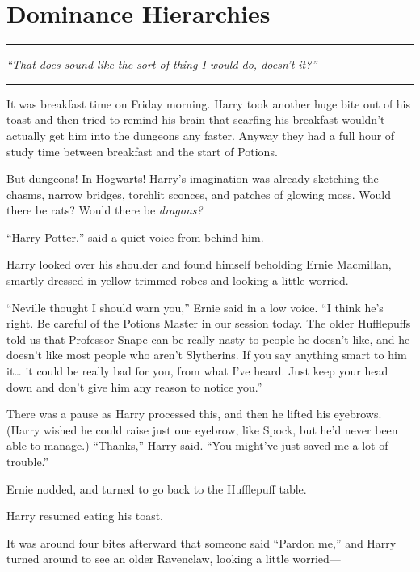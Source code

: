 \chapter{Dominance Hierarchies}

\begin{center}\rule{3in}{0.4pt}\end{center}

\emph{``That does sound like the sort of thing I would do, doesn't
it?''}

\begin{center}\rule{3in}{0.4pt}\end{center}

It was breakfast time on Friday morning. Harry took another huge bite
out of his toast and then tried to remind his brain that scarfing his
breakfast wouldn't actually get him into the dungeons any faster. Anyway
they had a full hour of study time between breakfast and the start of
Potions.

But dungeons! In Hogwarts! Harry's imagination was already sketching the
chasms, narrow bridges, torchlit sconces, and patches of glowing moss.
Would there be rats? Would there be \emph{dragons?}

``Harry Potter,'' said a quiet voice from behind him.

Harry looked over his shoulder and found himself beholding Ernie
Macmillan, smartly dressed in yellow-trimmed robes and looking a little
worried.

``Neville thought I should warn you,'' Ernie said in a low voice. ``I
think he's right. Be careful of the Potions Master in our session today.
The older Hufflepuffs told us that Professor Snape can be really nasty
to people he doesn't like, and he doesn't like most people who aren't
Slytherins. If you say anything smart to him it\ldots{} it could be
really bad for you, from what I've heard. Just keep your head down and
don't give him any reason to notice you.''

There was a pause as Harry processed this, and then he lifted his
eyebrows. (Harry wished he could raise just one eyebrow, like Spock, but
he'd never been able to manage.) ``Thanks,'' Harry said. ``You might've
just saved me a lot of trouble.''

Ernie nodded, and turned to go back to the Hufflepuff table.

Harry resumed eating his toast.

It was around four bites afterward that someone said ``Pardon me,'' and
Harry turned around to see an older Ravenclaw, looking a little
worried---

